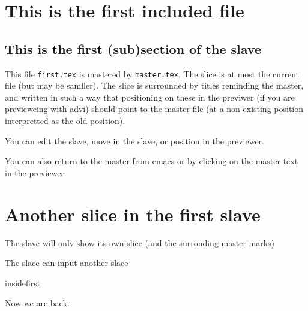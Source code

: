 
\section {This is the first included file}

\subsection {This is the first (sub)section of the slave}
 
This file {\tt first.tex} is mastered by {\tt master.tex}.  The slice is at
most the current file (but may be samller).  The slice is surrounded by
titles reminding the master, and written in such a way that positioning on
these in the previwer (if you are previeweing with advi) should point to the
master file (at a non-existing position interpretted as the old position).

You can edit the slave, move in the slave, or position in the previewer. 

You can also return to the master from emacs or by clicking on the master
text in the previewer.

\section {Another slice in the first slave}

The slave will only show its own slice (and the surronding master marks)

The slace can input another slace

 {insidefirst}

Now we are back.



